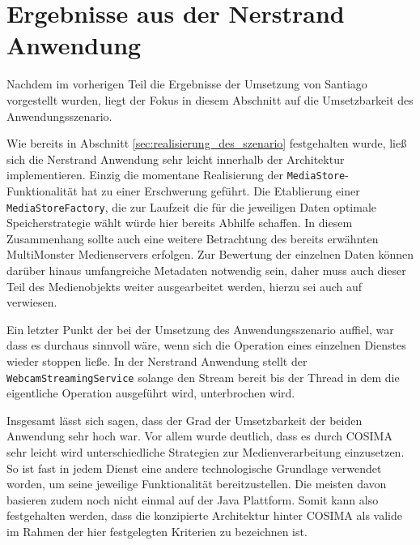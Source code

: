 

\section{Ergebnisse aus der Nerstrand Anwendung} %
\label{sec:ergebnisse_aus_der_nerstrand_anwendung}

  Nachdem im vorherigen Teil die Ergebnisse der Umsetzung von Santiago vorgestellt wurden, liegt der Fokus in diesem Abschnitt auf die Umsetzbarkeit des Anwendungsszenario.
  
  Wie bereits in Abschnitt \ref{sec:realisierung_des_szenario} festgehalten wurde, ließ sich die Nerstrand Anwendung sehr leicht innerhalb der Architektur implementieren. Einzig die momentane Realisierung der \verb!MediaStore!-Funktionalität hat zu einer Erschwerung geführt. Die Etablierung einer \verb!MediaStoreFactory!, die zur Laufzeit die für die jeweiligen Daten optimale Speicherstrategie wählt würde hier bereits Abhilfe schaffen. In diesem Zusammenhang sollte auch eine weitere Betrachtung des bereits erwähnten MultiMonster Medienservers erfolgen. Zur Bewertung der einzelnen Daten können darüber hinaus umfangreiche Metadaten notwendig sein, daher muss auch dieser Teil des Medienobjekts weiter ausgearbeitet werden, hierzu sei auch auf \citep{lehmann09} verwiesen.
  
  Ein letzter Punkt der bei der Umsetzung des Anwendungsszenario auffiel, war dass es durchaus sinnvoll wäre, wenn sich die Operation eines einzelnen Dienstes wieder stoppen ließe. In der Nerstrand Anwendung stellt der \verb!WebcamStreamingService! solange den Stream bereit bis der Thread in dem die eigentliche Operation ausgeführt wird, unterbrochen wird.


  Insgesamt lässt sich sagen, dass der Grad der Umsetzbarkeit der beiden Anwendung sehr hoch war. Vor allem wurde deutlich, dass es durch COSIMA sehr leicht wird unterschiedliche Strategien zur Medienverarbeitung einzusetzen. So ist fast in jedem Dienst eine andere technologische Grundlage verwendet worden, um seine jeweilige Funktionalität bereitzustellen. Die meisten davon basieren zudem noch nicht einmal auf der Java Plattform. Somit kann also festgehalten werden, dass die konzipierte Architektur hinter COSIMA als valide im Rahmen der hier festgelegten Kriterien zu bezeichnen ist.

